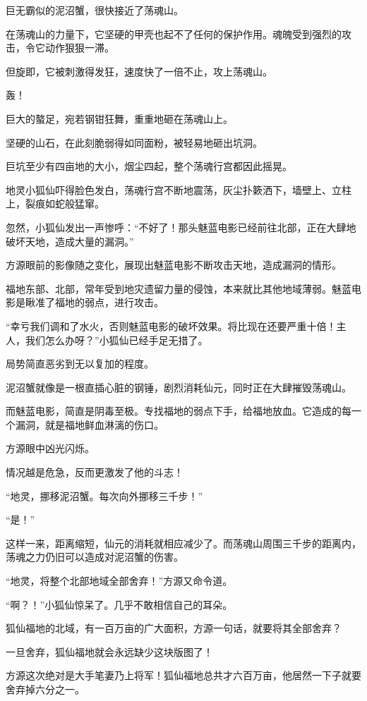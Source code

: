 \begin{this_body}
巨无霸似的泥沼蟹，很快接近了荡魂山。

在荡魂山的力量下，它坚硬的甲壳也起不了任何的保护作用。魂魄受到强烈的攻击，令它动作狠狠一滞。

但旋即，它被刺激得发狂，速度快了一倍不止，攻上荡魂山。

轰！

巨大的螯足，宛若钢钳狂舞，重重地砸在荡魂山上。

坚硬的山石，在此刻脆弱得如同面粉，被轻易地砸出坑洞。

巨坑至少有四亩地的大小，烟尘四起，整个荡魂行宫都因此摇晃。

地灵小狐仙吓得脸色发白，荡魂行宫不断地震荡，灰尘扑簌洒下，墙壁上、立柱上，裂痕如蛇般猛窜。

忽然，小狐仙发出一声惨呼：“不好了！那头魅蓝电影已经前往北部，正在大肆地破坏天地，造成大量的漏洞。”

方源眼前的影像随之变化，展现出魅蓝电影不断攻击天地，造成漏洞的情形。

福地东部、北部，常年受到地灾遗留力量的侵蚀，本来就比其他地域薄弱。魅蓝电影是瞅准了福地的弱点，进行攻击。

“幸亏我们调和了水火，否则魅蓝电影的破坏效果。将比现在还要严重十倍！主人，我们怎么办呀？”小狐仙已经手足无措了。

局势简直恶劣到无以复加的程度。

泥沼蟹就像是一根直插心脏的钢锤，剧烈消耗仙元，同时正在大肆摧毁荡魂山。

而魅蓝电影，简直是阴毒至极。专找福地的弱点下手，给福地放血。它造成的每一个漏洞，就是福地鲜血淋漓的伤口。

方源眼中凶光闪烁。

情况越是危急，反而更激发了他的斗志！

“地灵，挪移泥沼蟹。每次向外挪移三千步！”

“是！”

这样一来，距离缩短，仙元的消耗就相应减少了。而荡魂山周围三千步的距离内，荡魂之力仍旧可以造成对泥沼蟹的伤害。

“地灵，将整个北部地域全部舍弃！”方源又命令道。

“啊？！”小狐仙惊呆了。几乎不敢相信自己的耳朵。

狐仙福地的北域，有一百万亩的广大面积，方源一句话，就要将其全部舍弃？

一旦舍弃，狐仙福地就会永远缺少这块版图了！

方源这次绝对是大手笔妻乃上将军！狐仙福地总共才六百万亩，他居然一下子就要舍弃掉六分之一。


\end{this_body}
